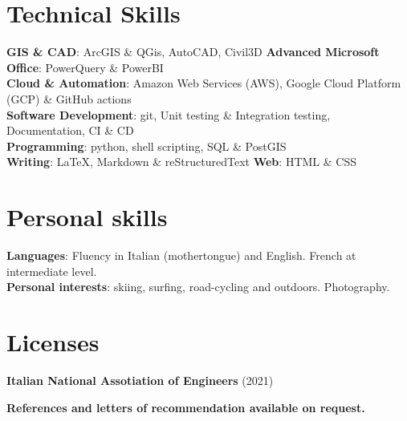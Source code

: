 \documentclass[letterpaper,11pt]{article}
\begin{document}
\section{Technical Skills}
 \begin{itemize}[leftmargin=0.15in, label={}]
    \small{\item{
     \textbf{GIS \& CAD}{: ArcGIS \& QGis, AutoCAD, Civil3D} \textbf{Advanced Microsoft Office}{: PowerQuery \& PowerBI} \\
     \textbf{Cloud \& Automation}{: Amazon Web Services (AWS), Google Cloud Platform (GCP) \& GitHub actions}\\
     \textbf{Software Development}{: git, Unit testing \& Integration testing, Documentation, CI \& CD}\\
     \textbf{Programming}{: python, shell scripting, SQL \& PostGIS}\\
     \textbf{Writing}{: \LaTeX\:, Markdown \& reStructuredText}     \textbf{Web}{: HTML \& CSS}\\
    }}
 \end{itemize}


\section{Personal skills}
 \begin{itemize}[leftmargin=0.15in, label={}]
    \small{\item{
     \textbf{Languages}{: Fluency in Italian (mothertongue) and English. French at intermediate level.} \\
     \textbf{Personal interests}{: skiing, surfing, road-cycling and outdoors. Photography.}\\
    }}
 \end{itemize}

\section{Licenses}
 \begin{itemize}[leftmargin=0.15in, label={}]
    \small{\item{
     \textbf{Italian National Assotiation of Engineers}{ (2021)} \\}}
 \end{itemize}

\centering
\textbf{References and letters of recommendation available on request.}

\end{document}
